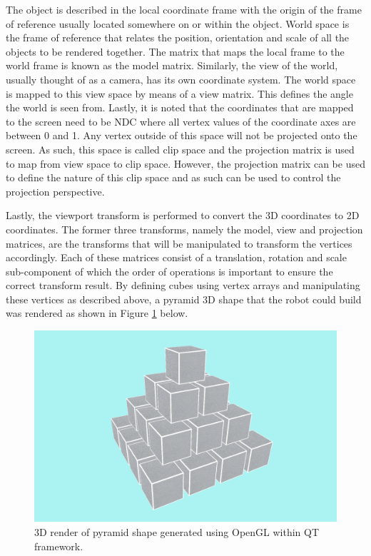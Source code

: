 The object is described in the local coordinate frame with the origin of the frame of reference usually located somewhere on or within the object. World space is the frame of reference that relates the position, orientation and scale of all the objects to be rendered together. The matrix that maps the local frame to the world frame is known as the model matrix. Similarly, the view of the world, usually thought of as a camera, has its own coordinate system. The world space is mapped to this view space by means of a view matrix. This defines the angle the world is seen from. Lastly, it is noted that the coordinates that are mapped to the screen need to be NDC where all vertex values of the coordinate axes are between 0 and 1. Any vertex outside of this space will not be projected onto the screen. As such, this space is called clip space and the projection matrix is used to map from view space to clip space. However, the projection matrix can be used to define the nature of this clip space and as such can be used to control the projection perspective. 

Lastly, the viewport transform is performed to convert the 3D coordinates to 2D coordinates. The former three transforms, namely the model, view and projection matrices, are the transforms that will be manipulated to transform the vertices accordingly. Each of these matrices consist of a translation, rotation and scale sub-component of which the order of operations is important to ensure the correct transform result. By defining cubes using vertex arrays and manipulating these vertices as described above, a pyramid 3D shape that the robot could build was rendered as shown in Figure \ref{fig:initial-opengl} below.

\begin{figure}[H]
	\centering
	\includegraphics[width=0.8\linewidth]{figures/initial-opengl-shape.PNG}
	\caption{3D render of pyramid shape generated using OpenGL within QT framework.}
	\label{fig:initial-opengl}
\end{figure}


